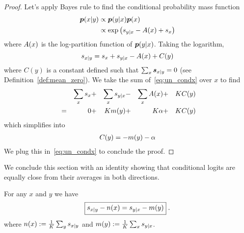 \begin{subappendices}
\begin{proof}
Let's apply Bayes rule to find the conditional probability mass function
\begin{align*}
    \bm{p}(x|y) 
    &\propto \bm{p}(y|x) \bm{p}(x) \\
    &\propto \exp \left({s}_{y|x} - A(x)
    + {s}_x\right)
\end{align*}
where $A(x)$ is the log-partition function of $\bm{p}(y|x)$.
Taking the logarithm, 
\begin{equation}
    \label{eq:un_condx}
    {s}_{x|y} = {s}_x + {s}_{y|x} - A(x) + C(y)
\end{equation}
where $C(y)$ is a constant defined such that $\sum_x {\bm{s}}_{x|y} = 0$ (see Definition~\ref{def:mean_zero}).
We take the sum of~\eqref{eq:un_condx} over $x$ to find
\begin{align*}
    & &\sum_x {s}_x& + &\sum_x {s}_{y|x}& - &\sum_xA(x)& + &K C(y)\\
    &= &0& + &Km(y)& + &K\alpha& +  &K C(y)
\end{align*}
which simplifies into
\begin{align*}
    C(y) = - m(y) - \alpha
\end{align*}
We plug this in~\eqref{eq:un_condx} to conclude the proof.
\end{proof}

%
We conclude this section with an identity showing that conditional logits are equally close from their averages in both directions.
\begin{lemma}
\label{lem:categorical_identity}
For any $x$ and $y$ we have 
\begin{equation}
    \label{eq:scores_identity}
    \boxed{{s}_{x|y} - n(x) = {s}_{y|x} - m(y)} \;.
\end{equation}
where $n(x):= \frac{1}{K} \sum_y {s}_{x|y}$ and $m(y):= \frac{1}{K} \sum_x {s}_{y|x}$. 
\end{lemma}


\end{subappendices}
